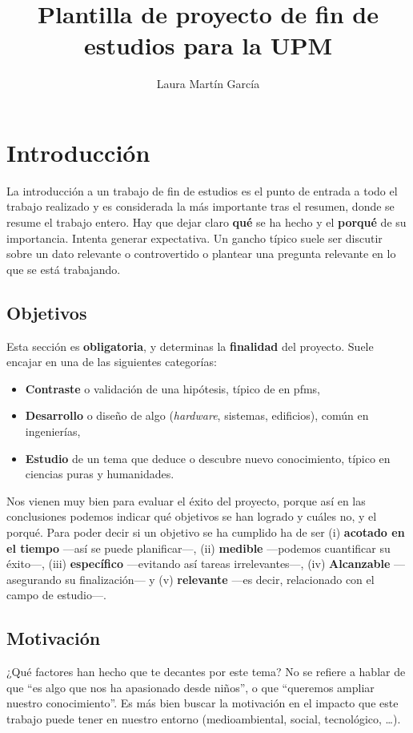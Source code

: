 \documentclass[%
    school=etsisi,%
    type=tfg,%
    degree=61CD,%
]{upm-report}
\title{Plantilla de proyecto de fin de estudios para la UPM}
\author{Laura Martín García}
\begin{document}
\chapter{Introducción}
\label{ch:introduccion}

La introducción a un trabajo de fin de estudios es el punto de entrada a
todo el trabajo realizado y es considerada la más importante tras el
resumen, donde se resume el trabajo entero. Hay que dejar claro
\textbf{qué} se ha hecho y el \textbf{porqué} de su importancia. Intenta
generar expectativa. Un gancho típico suele ser discutir sobre un dato
relevante o controvertido o plantear una pregunta relevante en lo que se
está trabajando.

\section{Objetivos}

Esta sección es \textbf{obligatoria}, y determinas la \textbf{finalidad}
del proyecto. Suele encajar en una de las siguientes categorías:

\begin{itemize}
    \item \textbf{Contraste} o validación de una hipótesis, típico de en
        \glspl{pfm},
    \item \textbf{Desarrollo} o diseño de algo (\textit{hardware},
        sistemas, edificios), común en ingenierías,
    \item \textbf{Estudio} de un tema que deduce o descubre nuevo
        conocimiento, típico en ciencias puras y humanidades.
\end{itemize}

Nos vienen muy bien para evaluar el éxito del proyecto, porque así en
las conclusiones podemos indicar qué objetivos se han logrado y cuáles
no, y el porqué. Para poder decir si un objetivo se ha cumplido ha de
ser (i) \textbf{acotado en el tiempo} ---así se puede planificar---,
(ii) \textbf{medible} ---podemos cuantificar su éxito---, (iii)
\textbf{específico} ---evitando así tareas irrelevantes---, (iv)
\textbf{Alcanzable}  ---asegurando su finalización--- y (v)
\textbf{relevante} ---es decir, relacionado con el campo de estudio---.

\section{Motivación}
\label{s:motivacion}

¿Qué factores han hecho que te decantes por este tema? No se refiere a
hablar de que \enquote{es algo que nos ha apasionado desde niños}, o que
\enquote{queremos ampliar nuestro conocimiento}. Es más bien buscar la
motivación en el impacto que este trabajo puede tener en nuestro entorno
(medioambiental, social, tecnológico, \ldots).
\end{document}
